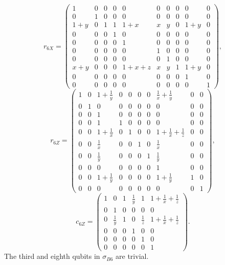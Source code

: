 \[
 r_{6X} =
\left(\begin{array}{cccccccccc}
 1 & 0 & 0 & 0 & 0 & 0 & 0 & 0 & 0 & 0 \\
 0 & 1 & 0 & 0 & 0 & 0 & 0 & 0 & 0 & 0 \\
 1+y & 0 & 1 & 1 & 1+x & x & y & 0 & 1+y & 0 \\
 0 & 0 & 0 & 1 & 0 & 0 & 0 & 0 & 0 & 0 \\
 0 & 0 & 0 & 0 & 1 & 0 & 0 & 0 & 0 & 0 \\
 0 & 0 & 0 & 0 & 0 & 1 & 0 & 0 & 0 & 0 \\
 0 & 0 & 0 & 0 & 0 & 0 & 1 & 0 & 0 & 0 \\
 x+y & 0 & 0 & 0 & 1+x+z & x & y & 1 & 1+y & 0 \\
 0 & 0 & 0 & 0 & 0 & 0 & 0 & 0 & 1 & 0 \\
 0 & 0 & 0 & 0 & 0 & 0 & 0 & 0 & 0 & 1
\end{array}\right),
\]
\[
 r_{6Z} =
\left(\begin{array}{cccccccccc}
 1 & 0 & 1+\frac{1}{y} & 0 & 0 & 0 & 0 & \frac{1}{x}+\frac{1}{y} & 0 & 0 \\
 0 & 1 & 0 & 0 & 0 & 0 & 0 & 0 & 0 & 0 \\
 0 & 0 & 1 & 0 & 0 & 0 & 0 & 0 & 0 & 0 \\
 0 & 0 & 1 & 1 & 0 & 0 & 0 & 0 & 0 & 0 \\
 0 & 0 & 1+\frac{1}{x} & 0 & 1 & 0 & 0 & 1+\frac{1}{x}+\frac{1}{z} & 0 & 0 \\
 0 & 0 & \frac{1}{x} & 0 & 0 & 1 & 0 & \frac{1}{x} & 0 & 0 \\
 0 & 0 & \frac{1}{y} & 0 & 0 & 0 & 1 & \frac{1}{y} & 0 & 0 \\
 0 & 0 & 0 & 0 & 0 & 0 & 0 & 1 & 0 & 0 \\
 0 & 0 & 1+\frac{1}{y} & 0 & 0 & 0 & 0 & 1+\frac{1}{y} & 1 & 0 \\
 0 & 0 & 0 & 0 & 0 & 0 & 0 & 0 & 0 & 1
\end{array}\right),
\]
\[
 c_{6Z} =
\left(\begin{array}{cccccc}
 1 & 0 & 1 & \frac{1}{y} & 1 & 1+\frac{1}{x}+\frac{1}{z} \\
 0 & 1 & 0 & 0 & 0 & 0 \\
 0 & \frac{1}{y} & 1 & 0 & \frac{1}{z} & 1+\frac{1}{x}+\frac{1}{z} \\
 0 & 0 & 0 & 1 & 0 & 0 \\
 0 & 0 & 0 & 0 & 1 & 0 \\
 0 & 0 & 0 & 0 & 0 & 1
\end{array}\right).
\]
The third and eighth qubits in $\sigma_{B6}$ are trivial.
